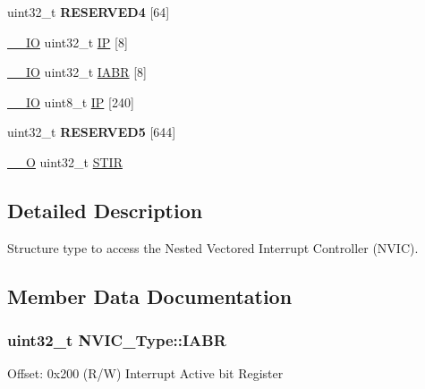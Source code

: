 \begin{DoxyCompactItemize}
\item 
uint32\+\_\+t {\bfseries R\+E\+S\+E\+R\+V\+E\+D4} \mbox{[}64\mbox{]}\hypertarget{structNVIC__Type_a712f552dc4649746daadfe9b86d88665}{}\label{structNVIC__Type_a712f552dc4649746daadfe9b86d88665}

\item 
\hyperlink{core__sc300_8h_aec43007d9998a0a0e01faede4133d6be}{\+\_\+\+\_\+\+IO} uint32\+\_\+t \hyperlink{structNVIC__Type_aa7d4c60e9bbf4b3d07a6b3ba39a7d7d9}{IP} \mbox{[}8\mbox{]}
\item 
\hyperlink{core__sc300_8h_aec43007d9998a0a0e01faede4133d6be}{\+\_\+\+\_\+\+IO} uint32\+\_\+t \hyperlink{structNVIC__Type_ac86c5bac0af593beb8004ab0ff9097bc}{I\+A\+BR} \mbox{[}8\mbox{]}
\item 
\hyperlink{core__sc300_8h_aec43007d9998a0a0e01faede4133d6be}{\+\_\+\+\_\+\+IO} uint8\+\_\+t \hyperlink{structNVIC__Type_a6524789fedb94623822c3e0a47f3d06c}{IP} \mbox{[}240\mbox{]}
\item 
uint32\+\_\+t {\bfseries R\+E\+S\+E\+R\+V\+E\+D5} \mbox{[}644\mbox{]}\hypertarget{structNVIC__Type_ad0598b9cd851203ff328a9c7c347f1b6}{}\label{structNVIC__Type_ad0598b9cd851203ff328a9c7c347f1b6}

\item 
\hyperlink{core__sc300_8h_a7e25d9380f9ef903923964322e71f2f6}{\+\_\+\+\_\+O} uint32\+\_\+t \hyperlink{structNVIC__Type_a0b0d7f3131da89c659a2580249432749}{S\+T\+IR}
\end{DoxyCompactItemize}


\subsection{Detailed Description}
Structure type to access the Nested Vectored Interrupt Controller (N\+V\+IC). 

\subsection{Member Data Documentation}
\subsubsection[{\texorpdfstring{I\+A\+BR}{IABR}}]{ uint32\+\_\+t N\+V\+I\+C\+\_\+\+Type\+::\+I\+A\+BR}\hypertarget{structNVIC__Type_ac86c5bac0af593beb8004ab0ff9097bc}{}\label{structNVIC__Type_ac86c5bac0af593beb8004ab0ff9097bc}
Offset\+: 0x200 (R/W) Interrupt Active bit Register 
